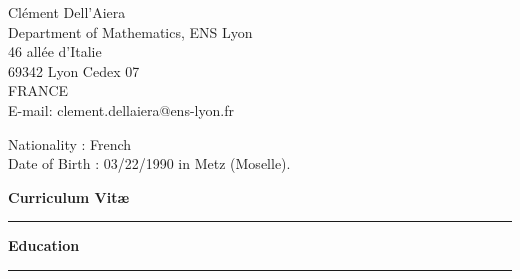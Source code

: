 \documentclass[a4paper,11pt]{article}
\newcommand{\titre}[1]{%
	\begin{center}
	\bigskip
	\rule{\textwidth}{1pt}
	\par\vspace{0.1cm}
        \textbf{\large #1}
	\par\rule{\textwidth}{1pt}
	\end{center}
	\bigskip
	}
\begin{document}
\begin{flushleft}
Clément Dell'Aiera \\
Department of Mathematics, ENS Lyon\\
46 allée d’Italie\\
69342 Lyon Cedex 07\\
FRANCE\\

\medskip
E-mail: clement.dellaiera@ens-lyon.fr


\end{flushleft}
\begin{flushleft}
Nationality : French \\
Date of Birth : 03/22/1990 in Metz (Moselle).
\end{flushleft}

\vspace{1.5cm}
\begin{center}
\par\huge{\textbf{Curriculum Vit\ae} }
\end{center}

\titre{Education}
\end{document}
